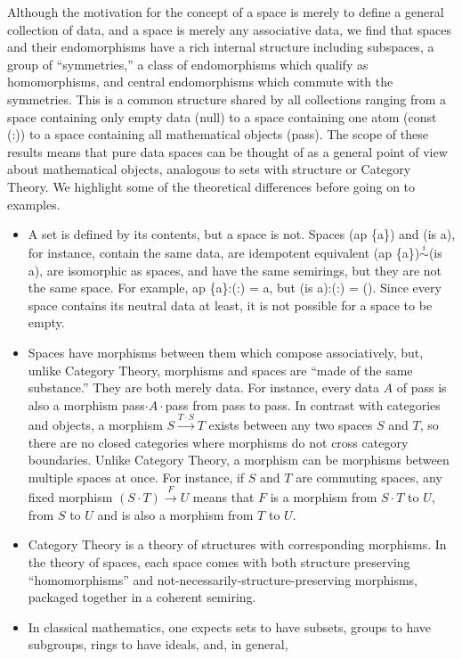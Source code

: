 \documentclass[11pt]{article}
\begin{document}
Although the motivation for the concept of a space is merely to define a general collection of data, and a space is merely any associative data, we 
find that spaces and their endomorphisms have a rich internal structure including subspaces, a group of ``symmetries,'' a class of endomorphisms which 
qualify as homomorphisms, and central endomorphisms which commute with the symmetries.  This is a common structure shared by all collections ranging 
from a space containing only empty data (null) to a space containing one atom (const (:)) to a space containing all mathematical objects (pass).  
The scope of these results means that pure data spaces can be thought of as a general point of view about mathematical objects, analogous to
sets with structure or Category Theory.  We highlight some of the theoretical differences before going on to examples.  
\begin{itemize}
\item{A set is defined by its contents, but a space is not.  Spaces (ap \{a\}) and (is a), for instance, contain the 
same data, are idempotent equivalent (ap \{a\})${\overset i\sim}$(is a), are isomorphic as spaces, and have 
the same semirings, but they are not the same space.  For example, ap \{a\}:(:) = a, but (is a):(:) = ().  Since every 
space contains its neutral data at least, it is not possible for a space to be empty.}
\item{Spaces have morphisms between them which compose associatively, but, unlike Category Theory, morphisms 
and spaces are ``made of the same substance.'' They are both merely data.  For instance, every data $A$ of pass is also 
a morphism pass$\cdot A\cdot$pass from pass to pass.  In contrast with categories and objects, a morphism 
$S{\overset {T\cdot S}\longrightarrow}T$ exists between any two spaces $S$ and $T$, so there are no closed categories 
where morphisms do not cross category boundaries.  Unlike Category Theory, a morphism can be morphisms between 
multiple spaces at once.  For instance, if $S$ and $T$ are commuting spaces, any fixed morphism $(S\cdot T){\overset F\rightarrow} U$ 
means that $F$ is a morphism from $S\cdot T$ to $U$, from $S$ to $U$ and is also a morphism from $T$ to $U$.}
\item{Category Theory is a theory of structures with corresponding morphisms.  In the theory of spaces, each space 
comes with both structure preserving ``homomorphisms'' and not-necessarily-structure-preserving morphisms, packaged together 
in a coherent semiring.} 
\item{In classical mathematics, one expects sets to have subsets, groups to have subgroups, rings to have ideals, and, in general, 
}
\end{itemize}
\end{document}
